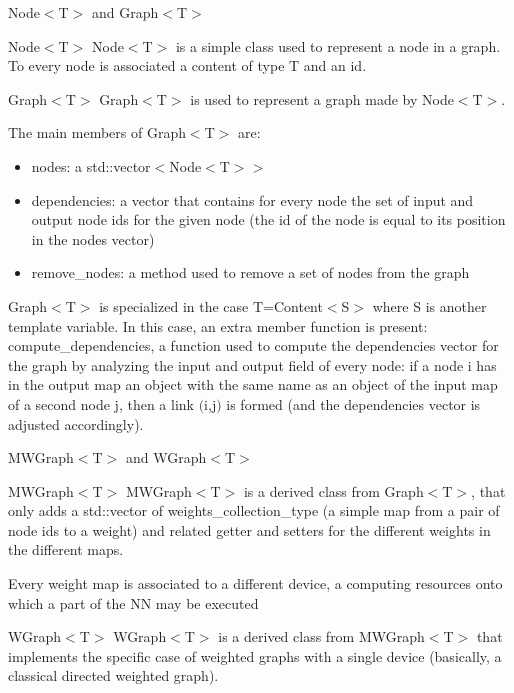 \begin{frame}[allowframebreaks]{Node$<$T$>$ and Graph$<$T$>$}
    \begin{block}{Node$<$T$>$}
    Node$<$T$>$ is a simple class used to represent a node in a graph. To every node is associated a content of type T and an id.
    \end{block}
    
    \begin{block}{Graph$<$T$>$}
    Graph$<$T$>$ is used to represent a graph made by Node$<$T$>$.
    \end{block}
    
    \framebreak
    
    The main members of Graph$<$T$>$ are:
    \begin{itemize}
        \item nodes: a std::vector$<$Node$<$T$>>$
        \item dependencies: a vector that contains for every node the set of input and output node ids for the given node (the id of the node is equal to its position in the nodes vector)
        \item remove\_nodes: a method used to remove a set of nodes from the graph
    \end{itemize}
    Graph$<$T$>$ is specialized in the case T=Content$<$S$>$ where S is another template variable. In this case, an extra member function is present: compute\_dependencies, a function used to compute the dependencies vector for the graph by analyzing the input and output field of every node: if a node i has in the output map an object with the same name as an object of the input map of a second node j, then a link $($i,j$)$ is formed (and the dependencies vector is adjusted accordingly).
\end{frame}

\begin{frame}{MWGraph$<$T$>$ and WGraph$<$T$>$}
    \begin{alertblock}{MWGraph$<$T$>$}
    MWGraph$<$T$>$ is a derived class from Graph$<$T$>$, that only adds a std::vector of weights\_collection\_type (a simple map from a pair of node ids to a weight) and related getter and setters for the different weights in the different maps. 
    \end{alertblock}
    
    Every weight map is associated to a different device, a computing resources onto which a part of the NN may be executed
    
    \begin{block}{WGraph$<$T$>$}
    WGraph$<$T$>$ is a derived class from MWGraph$<$T$>$ that implements the specific case of weighted graphs with a single device (basically, a classical directed weighted graph).
    \end{block}
    
    
\end{frame}